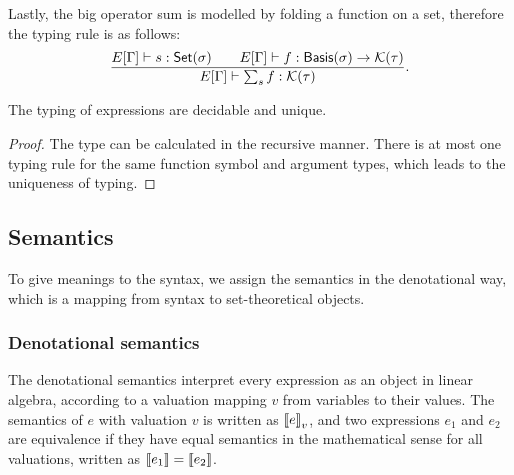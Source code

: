 \documentclass[runningheads]{llncs}
\begin{document}
Lastly, the big operator sum is modelled by folding a function on a set, therefore the typing rule is as follows:
\[
    \frac{E[\Gamma] \vdash s : \mathsf{Set}(\sigma) \qquad E[\Gamma] \vdash f : \mathsf{Basis}(\sigma) \to \mathcal{K}(\tau)}{E[\Gamma] \vdash \sum_{s} f : \mathcal{K}(\tau)}.
\]




\begin{lemma}
    The typing of expressions are decidable and unique.
\end{lemma}

\begin{proof}
    The type can be calculated in the recursive manner. There is at most one typing rule for the same function symbol and argument types, which leads to the uniqueness of typing.
\end{proof}

\subsection{Semantics}



To give meanings to the syntax, we assign the semantics in the denotational way, which is a mapping from syntax to set-theoretical objects.

\subsubsection{Denotational semantics} 
The denotational semantics interpret every expression as an object in linear algebra, according to a valuation mapping $v$ from variables to their values. 
The semantics of $e$ with valuation $v$ is written as ${\llbracket e \rrbracket}_v$, and two expressions $e_1$ and $e_2$ are equivalence if they have equal semantics in the mathematical sense for all valuations, written as ${\llbracket e_1 \rrbracket} = {\llbracket e_2 \rrbracket}$.
\end{document}

